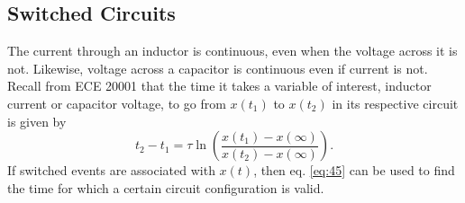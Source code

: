 \documentclass[nobib]{tufte-handout}
\begin{document}
\subsection{Switched Circuits}

The current through an inductor is continuous, 
even when the voltage across it is not. Likewise,
voltage across a capacitor is continuous even if 
current is not. Recall from ECE 20001 that the time 
it takes a variable of interest, inductor current 
or capacitor voltage, to go from $x(t_1)$ to $x(t_2)$
in its respective circuit is given by 
\begin{equation} \label{eq:45}
    t_2 - t_1 = \tau \ln{\left(\frac{x(t_1) - x(\infty)}{x(t_2) - x(\infty)}\right)}.
\end{equation}
If switched events are associated with $x(t)$, then 
eq. \ref{eq:45} can be used to find the time for which 
a certain circuit configuration is valid. 
\end{document}
